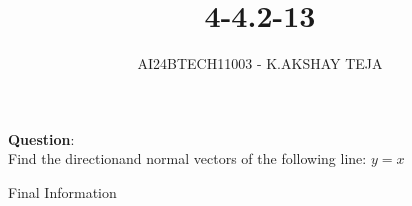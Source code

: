 \documentclass[journal]{IEEEtran}
\begin{document}

\vspace{3cm}

\title{4-4.2-13}
\author{AI24BTECH11003 - K.AKSHAY TEJA}
{\let\newpage\relax\maketitle}

\renewcommand{\thefigure}{\theenumi}
\renewcommand{\thetable}{\theenumi}
\setlength{\intextsep}{10pt} %


\renewcommand{\thetable}{\theenumi}


\textbf{Question}:\\
Find the directionand normal vectors of the following line: $y=x$

\solution
\begin{table}[h!]
	\centering
	
	\caption{Final Information}
	\label{tab:4-4.2-13}
\end{table}
\end{document}
